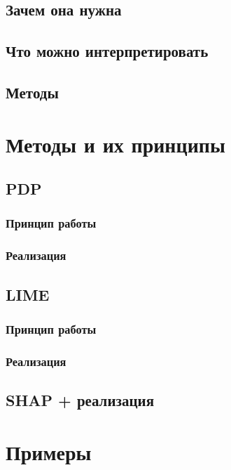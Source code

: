 \documentclass[a4paper, 12pt]{article}
\begin{document}
	\subsection{Зачем она нужна}
		
	\subsection{Что можно интерпретировать}
	
	\subsection{Методы}
	
	\newpage
	
	\section{Методы и их принципы}
	\subsection{PDP}
	
	\subsubsection{Принцип работы}
	
	\subsubsection{Реализация}
	
	\subsection{LIME}
	
	\subsubsection{Принцип работы}
	
	\subsubsection{Реализация}
	
	\subsection{SHAP + реализация}
	
	\newpage

	\section{Примеры}
\end{document}
